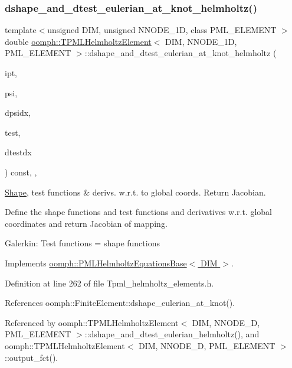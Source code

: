 \subsubsection{\texorpdfstring{dshape\+\_\+and\+\_\+dtest\+\_\+eulerian\+\_\+at\+\_\+knot\+\_\+helmholtz()}{dshape\_and\_dtest\_eulerian\_at\_knot\_helmholtz()}}
{\footnotesize\ttfamily template$<$unsigned D\+IM, unsigned N\+N\+O\+D\+E\+\_\+1D, class P\+M\+L\+\_\+\+E\+L\+E\+M\+E\+NT $>$ \\
double \hyperlink{classoomph_1_1TPMLHelmholtzElement}{oomph\+::\+T\+P\+M\+L\+Helmholtz\+Element}$<$ D\+IM, N\+N\+O\+D\+E\+\_\+1D, P\+M\+L\+\_\+\+E\+L\+E\+M\+E\+NT $>$\+::dshape\+\_\+and\+\_\+dtest\+\_\+eulerian\+\_\+at\+\_\+knot\+\_\+helmholtz (\begin{DoxyParamCaption}\item[{const unsigned \&}]{ipt,  }\item[{\hyperlink{classoomph_1_1Shape}{Shape} \&}]{psi,  }\item[{\hyperlink{classoomph_1_1DShape}{D\+Shape} \&}]{dpsidx,  }\item[{\hyperlink{classoomph_1_1Shape}{Shape} \&}]{test,  }\item[{\hyperlink{classoomph_1_1DShape}{D\+Shape} \&}]{dtestdx }\end{DoxyParamCaption}) const\hspace{0.3cm}{\ttfamily [inline]}, {\ttfamily [protected]}, {\ttfamily [virtual]}}



\hyperlink{classoomph_1_1Shape}{Shape}, test functions \& derivs. w.\+r.\+t. to global coords. Return Jacobian. 

Define the shape functions and test functions and derivatives w.\+r.\+t. global coordinates and return Jacobian of mapping.

Galerkin\+: Test functions = shape functions 

Implements \hyperlink{classoomph_1_1PMLHelmholtzEquationsBase_aa283cd2415e7b9f9f3f7a71188403c8a}{oomph\+::\+P\+M\+L\+Helmholtz\+Equations\+Base$<$ D\+I\+M $>$}.



Definition at line 262 of file Tpml\+\_\+helmholtz\+\_\+elements.\+h.



References oomph\+::\+Finite\+Element\+::dshape\+\_\+eulerian\+\_\+at\+\_\+knot().



Referenced by oomph\+::\+T\+P\+M\+L\+Helmholtz\+Element$<$ D\+I\+M, N\+N\+O\+D\+E\+\_\+D, P\+M\+L\+\_\+\+E\+L\+E\+M\+E\+N\+T $>$\+::dshape\+\_\+and\+\_\+dtest\+\_\+eulerian\+\_\+helmholtz(), and oomph\+::\+T\+P\+M\+L\+Helmholtz\+Element$<$ D\+I\+M, N\+N\+O\+D\+E\+\_\+D, P\+M\+L\+\_\+\+E\+L\+E\+M\+E\+N\+T $>$\+::output\+\_\+fct().

